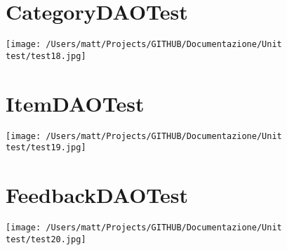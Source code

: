 \section{CategoryDAOTest}
\texttt{[image: /Users/matt/Projects/GITHUB/Documentazione/Unit test/test18.jpg]}

\section{ItemDAOTest}
\texttt{[image: /Users/matt/Projects/GITHUB/Documentazione/Unit test/test19.jpg]}

\section{FeedbackDAOTest}
\texttt{[image: /Users/matt/Projects/GITHUB/Documentazione/Unit test/test20.jpg]}

